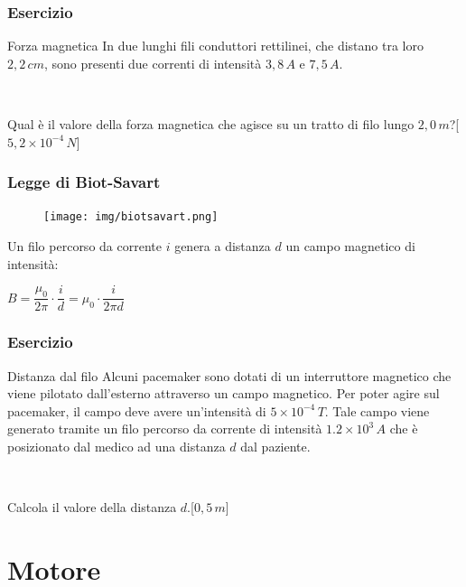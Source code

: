 \documentclass[]{beamer}
\theoremstyle{plain}
\begin{document}
\begin{frame}
\frametitle{Esercizio}
\begin{exampleblock}{Forza magnetica}
  In due lunghi fili conduttori rettilinei, che distano tra loro $ 2,2 \, cm $, sono presenti due correnti di intensità $ 3,8 \, A $ e $ 7,5 \, A $.

  ~

  Qual è il valore della forza magnetica che agisce su un tratto di filo lungo $ 2,0 \, m $?\hspace{\fill}[$ 5,2 \times 10^{-4} \, N $]
\end{exampleblock} 
\end{frame}


\begin{frame}
\frametitle{Legge di Biot-Savart}
\begin{figure}
\texttt{[image: img/biotsavart.png]}
\end{figure}
Un filo percorso da corrente $ i $ genera a distanza $ d $ un campo magnetico di intensità:
\begin{center}
\colorbox{marroncino!30}{$ B = \dfrac{\mu_0}{2\pi} \cdot \dfrac{i}{d} = \mu_0 \cdot \dfrac{i}{2\pi d} $}
\end{center}
\end{frame}



\begin{frame}
\frametitle{Esercizio}
\begin{exampleblock}{Distanza dal filo}
  Alcuni pacemaker sono dotati di un interruttore magnetico che viene pilotato dall'esterno attraverso un campo magnetico. Per poter agire sul pacemaker, il campo deve avere un'intensità di $ 5 \times 10^{-4} \, T $. Tale campo viene generato tramite un filo percorso da corrente di intensità $ 1.2 \times 10^{3} \, A $ che è posizionato dal medico ad una distanza $ d $ dal paziente.

  ~

  Calcola il valore della distanza $ d $.\hspace{\fill}[$ 0,5 \, m $]
\end{exampleblock} 
\end{frame}




\section{Motore}
\end{document}
